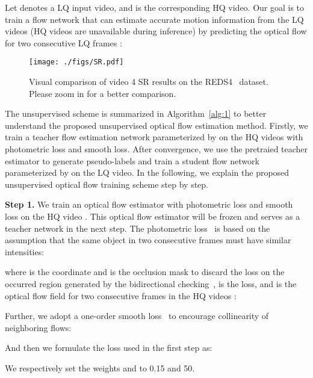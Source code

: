 \documentclass[nohyperref]{article}
\theoremstyle{plain}
\theoremstyle{definition}
\theoremstyle{remark}
\begin{document}
Let  denotes a LQ input video, and  is the corresponding HQ video. Our goal is to train a flow network  that can estimate accurate motion information from the LQ videos (HQ videos are unavailable during inference) by predicting the optical flow  for two consecutive LQ frames :


\begin{figure*}[t!]
\centering
\texttt{[image: ./figs/SR.pdf]}
\vspace{-4.5mm}
\caption{Visual comparison of video 4 SR results on the REDS4~\cite{r58} dataset. Please zoom in for a better comparison.}
\label{SR_vis}
\vspace{-3mm}
\end{figure*}
\vspace{-2mm}
The unsupervised scheme is summarized in Algorithm~\ref{alg:1} to better understand the proposed unsupervised optical flow estimation method. Firstly, we train a teacher flow estimation network parameterized by  on the HQ videos with photometric loss and smooth loss. After convergence, we use the pretraied teacher estimator to generate pseudo-labels and train a student flow network parameterized by  on the LQ video. In the following, we explain the proposed unsupervised optical flow training scheme step by step.

\textbf{Step 1.} We train an optical flow estimator  with photometric loss and smooth loss on the HQ video . This optical flow estimator  will be frozen and serves as a teacher network in the next step. The photometric loss~\cite{photometric_loss} is based on the assumption that the same object in two consecutive frames must have similar intensities:

where  is the coordinate and  is the occlusion mask to discard the loss on the occurred region generated by the bidirectional checking~\cite{wang2018occlusion},  is the   loss, and  is the optical flow field for two consecutive frames in the HQ videos :


Further, we adopt a one-order smooth loss~\cite{smooth_loss} to encourage collinearity of neighboring flows:

And then we formulate the loss used in the first step as:

We respectively set the weights  and  to 0.15 and 50.
\end{document}
